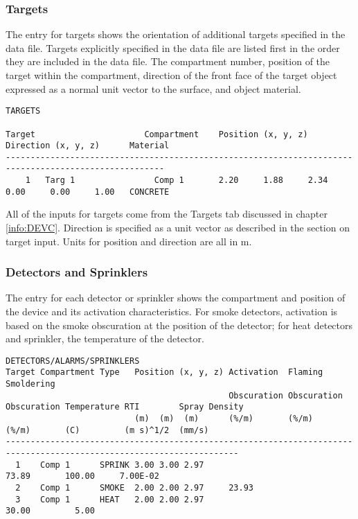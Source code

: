 \subsubsection{Targets}

The entry for targets shows the orientation of additional targets specified in the data file. Targets explicitly specified in the data file are listed first in the order they are included in the data file. The compartment number, position of the target within the compartment, direction of the front face of the target object expressed as a normal unit vector to the surface, and object material.

\begin{lstlisting}[basicstyle=\tiny]
TARGETS

Target                      Compartment    Position (x, y, z)         Direction (x, y, z)      Material
------------------------------------------------------------------------------------------------------
    1   Targ 1                Comp 1       2.20     1.88     2.34     0.00     0.00     1.00   CONCRETE
\end{lstlisting}

All of the inputs for targets come from the Targets tab discussed in chapter \ref{info:DEVC}. Direction is specified as a unit vector as described in the section on target input. Units for position and direction are all in m.

\subsubsection{Detectors and Sprinklers}

The entry for each detector or sprinkler shows the compartment and position of the device and its activation characteristics. For smoke detectors, activation is based on the smoke obscuration at the position of the detector; for heat detectors and sprinkler, the temperature of the detector.


\begin{lstlisting}[basicstyle=\tiny]
DETECTORS/ALARMS/SPRINKLERS
Target Compartment Type   Position (x, y, z) Activation  Flaming     Smoldering
                                             Obscuration Obscuration Obscuration Temperature RTI        Spray Density
                          (m)  (m)  (m)      (%/m)       (%/m)       (%/m)       (C)         (m s)^1/2  (mm/s)
---------------------------------------------------------------------------------------------------------------------
  1    Comp 1      SPRINK 3.00 3.00 2.97                                         73.89       100.00     7.00E-02
  2    Comp 1      SMOKE  2.00 2.00 2.97     23.93
  3    Comp 1      HEAT   2.00 2.00 2.97                                         30.00         5.00
\end{lstlisting}

